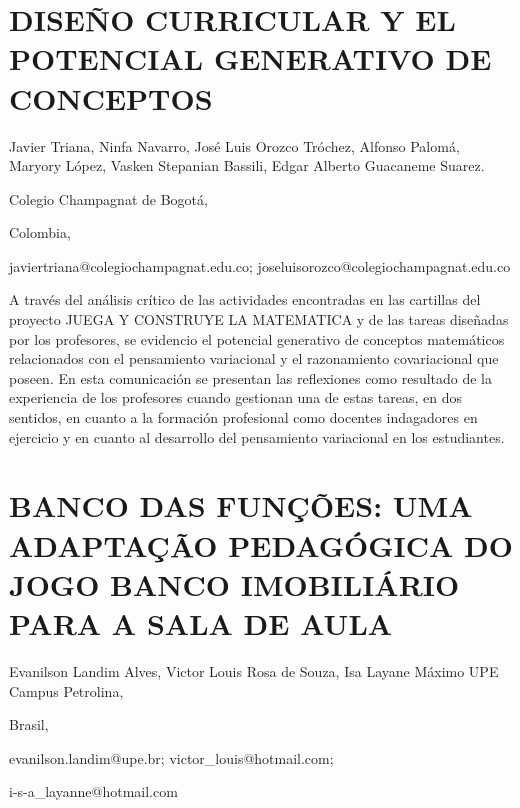 \renewcommand\thesection{CB\ \nplpadding{3}\numprint{\arabic{section}}}

\setcounter{section}{153}


\section{DISEÑO CURRICULAR Y EL POTENCIAL GENERATIVO DE CONCEPTOS}

\begin{datos}

Javier Triana, Ninfa Navarro, José Luis Orozco Tróchez, Alfonso Palomá,
Maryory López, Vasken Stepanian Bassili, Edgar Alberto Guacaneme Suarez.

Colegio Champagnat de Bogotá,

Colombia,

javiertriana@colegiochampagnat.edu.co; joseluisorozco@colegiochampagnat.edu.co

\end{datos}

A través del análisis crítico de las actividades encontradas en las
cartillas del proyecto \textquotedbl{}JUEGA Y CONSTRUYE LA MATEMATICA\textquotedbl{}
y de las tareas diseñadas por los profesores, se evidencio el potencial
generativo de conceptos matemáticos relacionados con el pensamiento
variacional y el razonamiento covariacional que poseen. En esta comunicación
se presentan las reflexiones como resultado de la experiencia de los
profesores cuando gestionan una de estas tareas, en dos sentidos,
en cuanto a la formación profesional como docentes indagadores en
ejercicio y en cuanto al desarrollo del pensamiento variacional en
los estudiantes. 

\newpage\setcounter{section}{155}


\section{BANCO DAS FUNÇÕES: UMA ADAPTAÇÃO PEDAGÓGICA DO JOGO BANCO IMOBILIÁRIO
PARA A SALA DE AULA}

\begin{datos}

Evanilson Landim Alves, Victor Louis Rosa de Souza, Isa Layane Máximo
UPE Campus Petrolina,

Brasil,

evanilson.landim@upe.br; victor\_louis@hotmail.com;

i-s-a\_layanne@hotmail.com

\end{datos}


